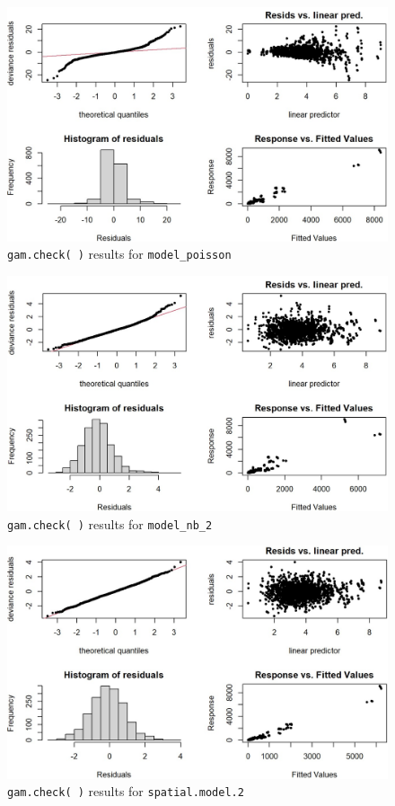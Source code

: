 \begin{figure}[H]
\centering
\includegraphics[scale=0.5]{model_poisson_check.jpg}
\caption{\label{fig:model_poisson_check}\texttt{gam.check( )} results for \texttt{model\_poisson}}
\end{figure}

\begin{figure}[H]
\centering
\includegraphics[scale=0.5]{model_nb_2_check.jpg}
\caption{\label{fig:model_nb_2_check}\texttt{gam.check( )} results for \texttt{model\_nb\_2}}
\end{figure}

\begin{figure}[H]
\centering
\includegraphics[scale=0.5]{spatial_model_2_check.jpg}
\caption{\label{fig:spatial_model_2_check}\texttt{gam.check( )} results for \texttt{spatial.model.2}}
\end{figure}


